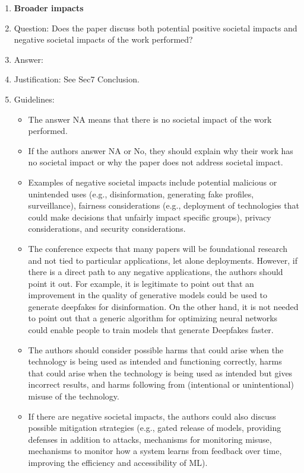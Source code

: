 \documentclass{article}
\begin{document}
\begin{enumerate}
\item {\bf Broader impacts}
    \item[] Question: Does the paper discuss both potential positive societal impacts and negative societal impacts of the work performed?
    \item[] Answer: \answerYes{} %
    \item[] Justification: See Sec7 Conclusion.
    \item[] Guidelines:
    \begin{itemize}
        \item The answer NA means that there is no societal impact of the work performed.
        \item If the authors answer NA or No, they should explain why their work has no societal impact or why the paper does not address societal impact.
        \item Examples of negative societal impacts include potential malicious or unintended uses (e.g., disinformation, generating fake profiles, surveillance), fairness considerations (e.g., deployment of technologies that could make decisions that unfairly impact specific groups), privacy considerations, and security considerations.
        \item The conference expects that many papers will be foundational research and not tied to particular applications, let alone deployments. However, if there is a direct path to any negative applications, the authors should point it out. For example, it is legitimate to point out that an improvement in the quality of generative models could be used to generate deepfakes for disinformation. On the other hand, it is not needed to point out that a generic algorithm for optimizing neural networks could enable people to train models that generate Deepfakes faster.
        \item The authors should consider possible harms that could arise when the technology is being used as intended and functioning correctly, harms that could arise when the technology is being used as intended but gives incorrect results, and harms following from (intentional or unintentional) misuse of the technology.
        \item If there are negative societal impacts, the authors could also discuss possible mitigation strategies (e.g., gated release of models, providing defenses in addition to attacks, mechanisms for monitoring misuse, mechanisms to monitor how a system learns from feedback over time, improving the efficiency and accessibility of ML).
    \end{itemize}
    

\end{enumerate}
\end{document}
